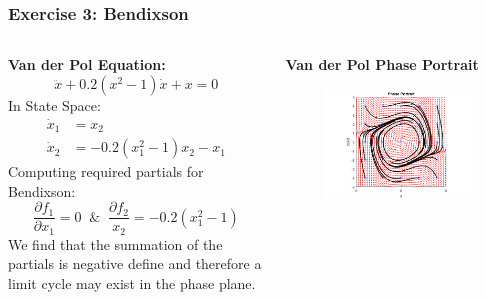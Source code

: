 \documentclass[11pt,handout]{beamer}   %
\begin{document}
\begin{frame}
\frametitle{Exercise 3: Bendixson}
\begin{columns}
\begin{column}{0.5\textwidth}
\small
\textbf{Van der Pol Equation:}
\begin{equation*}
\ddot{x} + 0.2(x^2 - 1)\dot{x}+x = 0
\end{equation*}
In State Space:
\begin{equation*}
\begin{aligned}
\dot{x}_1 &= x_2\\
\dot{x}_2 &= -0.2(x_1^2 - 1)x_2 - x_1
\end{aligned}
\end{equation*}
Computing required partials for Bendixson:
\begin{equation*}
\frac{\partial f_1}{\partial x_1} = 0 \;\; \& \;\; \frac{\partial f_2}{x_2} = -0.2(x_1^2-1)
\end{equation*}
We find that the summation of the partials is negative define and therefore a limit cycle may exist in the phase plane.
\end{column}
\begin{column}{0.5\textwidth}
\centering
\textbf{Van der Pol Phase Portrait}
\begin{figure}
\centering
\includegraphics[width = \textwidth]{Figures/VanderPol.png}
\end{figure}
\end{column}
\end{columns}
\end{frame}


\end{document}
